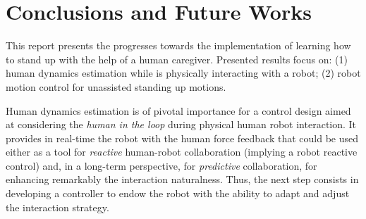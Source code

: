 
\section{Conclusions and Future Works}
%
This report presents the progresses towards the implementation of 
learning how to stand up with the help of a human caregiver.
Presented results focus on: (1) human dynamics estimation while is physically 
interacting with a robot; (2) robot motion control for unassisted standing up 
motions. 

Human dynamics estimation is of pivotal importance
for a control design aimed at considering the \emph{human in the loop}
during physical human robot interaction. 
It provides in real-time the robot with the human force feedback
that could be used either as a tool for \emph{reactive} human-robot collaboration
(implying a robot reactive control) and, in a long-term perspective,
for \emph{predictive} collaboration, for enhancing remarkably the interaction naturalness.
Thus, the next step consists in developing a controller to endow the 
robot with the ability to adapt and adjust the interaction strategy.

 
 
 
 
 
 
 
 
 
 
  
  